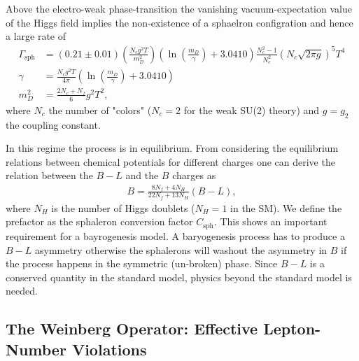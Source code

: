 \documentclass[13pt,a4paper,titlepage]{article}
\begin{document}
\noindent
Above the electro-weak phase-transition the vanishing vacuum-expectation value of the Higgs field implies the non-existence of a sphaelron configration and hence a large rate of \cite{sphaleron_rate_symmetric_phase_Moore_2011}
\begin{align}
    \Gamma_{\mathrm{sph}} &= (0.21 \pm 0.01) \left(\frac{N_c g^2 T}{m_D^2} \right) \left(\ln \left(\frac{m_D}{\gamma} \right) + 3.0410 \right) \frac{N_c^2 - 1}{N_c^2} (N_c \sqrt{2 \pi g})^5 T^4 \\
    \gamma &= \frac{N_c g^2 T}{4 \pi} \left(\ln \left(\frac{m_D}{\gamma}\right) + 3.0410 \right) \\
    m_D^2 &= \frac{2N_c + N_f}{6} g^2 T^2,
\end{align}
where $N_c$ the number of "colors" ($N_c = 2$ for the weak SU(2) theory) and $g = g_2$ the coupling constant.

\noindent
In this regime the process is in equilibrium. From considering the
equilibrium relations between chemical potentials for different charges one
can derive the relation between the $B - L$ and the $B$ charges as \cite[sec 2.5]{Leptogenesis_review_doi:10.1146/annurev.nucl.55.090704.151558}
\begin{align}
    \label{eq:sphaleron_conversion}
    B = \frac{8 N_f + 4 N_H}{22 N_f + 13 N_H} (B - L),
\end{align}
where $N_H$ is the number of Higgs doublets ($N_H = 1$ in the SM). We define the prefactor as the sphaleron conversion factor $C_\mathrm{sph}$.
This shows an important requirement for a bayrogenesis model.
A baryogenesis process has to produce a $B - L$ asymmetry otherwise the sphalerons
will washout the asymmetry in $B$ if the process happens in the symmetric (un-broken) phase. Since $B - L$ is a conserved quantity in the standard model, physics beyond the standard model is needed.

\subsection{The Weinberg Operator: Effective Lepton-Number Violations}
\label{sec:lepton_number_violations}
\end{document}
